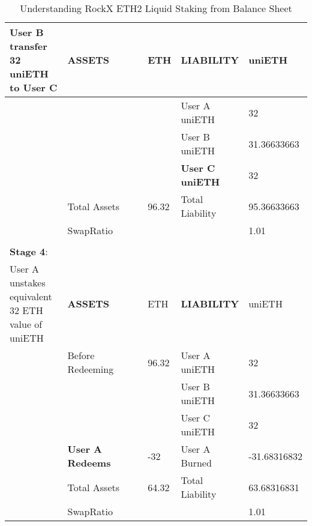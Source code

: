 \documentclass{article}
\begin{document}
\begin{table}[!ht]
\begin{tabular}{p{0.2\linewidth} | p{0.3\linewidth}| p{0.1\linewidth}| p{0.2\linewidth}| p{0.2\linewidth}}
        User B transfer 32 uniETH to User C & \textbf{ASSETS} & ETH & \textbf{LIABILITY} & uniETH \\ \hline
        ~ & ~ & ~ & User A uniETH & 32 \\ \hline
        ~ & ~ & ~ & User B uniETH & 31.36633663 \\ \hline
        ~ & ~ & ~ & \textbf{User C uniETH} & 32 \\ \hline
        ~ & Total Assets & 96.32 & Total Liability & 95.36633663 \\ \hline
        ~ & SwapRatio & ~ & ~ & 1.01 \\ \hline
        \multicolumn{5}{c}{} \\ \hline
        \textbf{Stage 4}: & ~ & ~ & ~ & ~ \\ \hline
          User A unstakes equivalent 32 ETH value of uniETH & \textbf{ASSETS} & ETH & \textbf{LIABILITY} & uniETH \\ \hline
        ~ & Before Redeeming & 96.32 & User A uniETH & 32 \\ \hline
        ~ & ~ & ~ & User B uniETH & 31.36633663 \\ \hline
        ~ & ~ & ~ & User C uniETH & 32 \\ \hline
        ~ & \textbf{User A Redeems} & -32 & User A Burned & -31.68316832 \\ \hline
        ~ & Total Assets & 64.32 & Total Liability & 63.68316831 \\ \hline
        ~ & SwapRatio & ~ & ~ & 1.01 \\ \hline
    \end{tabular}
    \caption{Understanding RockX ETH2 Liquid Staking from Balance Sheet}
\end{table}
\end{document}
